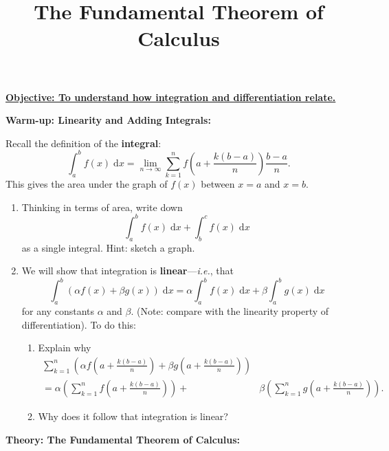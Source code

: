 \documentclass{article}
\newcommand{\diff}{\;\mathrm{d}}
\begin{document}
\title{The Fundamental Theorem of Calculus}
\date{}

\maketitle
\thispagestyle{empty}

\Large

\textbf{\underline{Objective: To understand how integration and differentiation relate.}}




\vspace{5mm}


\textbf{Warm-up: Linearity and Adding Integrals:}\bigskip

Recall the definition of the \textbf{integral}:
\[\int_a^b f(x)\diff x =\lim_{n\to\infty}\sum_{k=1}^n f\left(a+\frac{k(b-a)}{n}\right)\frac{b-a}{n}.\]
This gives the area under the graph of $f(x)$ between $x=a$ and $x=b$.

\bigskip


\begin{enumerate}
	\item Thinking in terms of area, write down
		\[\int_a^b f(x)\diff x+\int_b^c f(x)\diff x\]
		as a single integral. Hint: sketch a graph.
	\item We will show that integration is \textbf{linear}---\textit{i.e.}, that
		\[\int_a^b (\alpha f(x)+\beta g(x))\diff x=\alpha\int_a^b f(x)\diff x + \beta\int_a^b g(x)\diff x\]
		for any constants $\alpha$ and $\beta$. (Note: compare with the linearity property of differentiation). To do this:
			\begin{enumerate}
				\item Explain why
					\begin{align*}
						\sum_{k=1}^n \left(\alpha f\left(a+\frac{k(b-a)}{n}\right)+\beta g\left(a+\frac{k(b-a)}{n}\right)\right)\\
						=\alpha\left(\sum_{k=1}^n f\left(a+\frac{k(b-a)}{n}\right)\right) +&\beta\left(\sum_{k=1}^n  g\left(a+\frac{k(b-a)}{n}\right)\right).
					\end{align*}
				\item Why does it follow that integration is linear?
			\end{enumerate}
\end{enumerate}



\clearpage


\textbf{Theory: The Fundamental Theorem of Calculus:}
\end{document}
